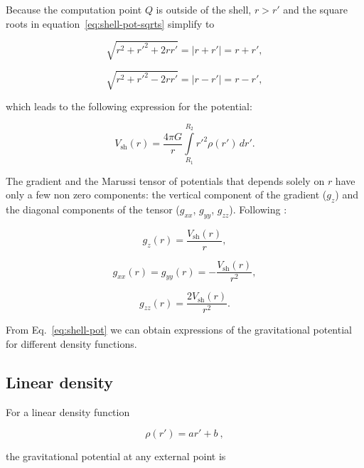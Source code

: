 \documentclass[extra, referee]{gji}
\begin{document}
Because the computation point $Q$ is outside of the shell, $r > r'$ and the square roots
in equation~\ref{eq:shell-pot-sqrts} simplify to

\begin{equation}
    \sqrt{r^2 + r'^2 + 2rr'} = |r + r'| = r + r',
\end{equation}

\begin{equation}
    \sqrt{r^2 + r'^2 - 2rr'} = |r - r'| = r - r',
\end{equation}

\noindent which leads to the following expression for the potential:

\begin{equation}
    V_\text{sh}(r) = \frac{4\pi G}{r}
    \int\limits_{R_1}^{R_2} {r'}^2 \rho(r') \, dr'.
\label{eq:shell-pot}
\end{equation}

The gradient and the Marussi tensor of potentials that
depends solely on $r$ have only a few non zero components: the vertical
component of the gradient ($g_z$) and the diagonal components of the
tensor ($g_{xx}$, $g_{yy}$, $g_{zz}$).
Following \citet{Grombein2013}:

\begin{equation}
    g_z(r) = \frac{V_\text{sh}(r)}{r},
\end{equation}

\begin{equation}
    g_{xx}(r) = g_{yy}(r) = -\frac{V_\text{sh}(r)}{r^2},
\end{equation}

\begin{equation}
    g_{zz}(r) = \frac{2V_\text{sh}(r)}{r^2}.
\end{equation}

From Eq.~\ref{eq:shell-pot} we can obtain expressions of the gravitational potential for
different density functions.

\subsection{Linear density}

For a linear density function

\begin{equation}
    \rho(r') = ar' + b\ ,
\end{equation}

\noindent
the gravitational potential at any external point is
\end{document}
